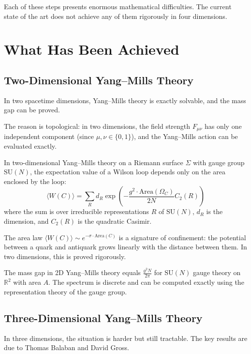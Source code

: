 Each of these steps presents enormous mathematical difficulties. The current state of the art does not achieve any of them rigorously in four dimensions.

\section{What Has Been Achieved}

\subsection{Two-Dimensional Yang--Mills Theory}

In two spacetime dimensions, Yang--Mills theory is exactly solvable, and the mass gap can be proved.

The reason is topological: in two dimensions, the field strength $F_{\mu\nu}$ has only one independent component (since $\mu, \nu \in \{0, 1\}$), and the Yang--Mills action can be evaluated exactly.

\begin{theorem}
In two-dimensional Yang--Mills theory on a Riemann surface $\Sigma$ with gauge group $\mathrm{SU}(N)$, the expectation value of a Wilson loop depends only on the area enclosed by the loop:
\[
\langle W(C) \rangle = \sum_R d_R \exp\left(-\frac{g^2 \cdot \mathrm{Area}(\Omega_C)}{2N} C_2(R)\right)
\]
where the sum is over irreducible representations $R$ of $\mathrm{SU}(N)$, $d_R$ is the dimension, and $C_2(R)$ is the quadratic Casimir.
\end{theorem}

The area law $\langle W(C) \rangle \sim e^{-\sigma \cdot \mathrm{Area}(C)}$ is a signature of confinement: the potential between a quark and antiquark grows linearly with the distance between them. In two dimensions, this is proved rigorously.

The mass gap in 2D Yang--Mills theory equals $\frac{g^2 N}{2\pi}$ for $\mathrm{SU}(N)$ gauge theory on $\mathbb{R}^2$ with area $A$. The spectrum is discrete and can be computed exactly using the representation theory of the gauge group.

\subsection{Three-Dimensional Yang--Mills Theory}

In three dimensions, the situation is harder but still tractable. The key results are due to Thomas Balaban and David Gross.

